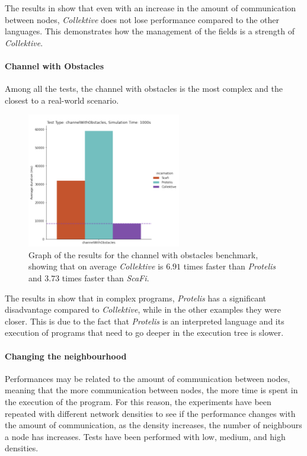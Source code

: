 The results in  show that even with an increase in the amount of communication between nodes,
\emph{Collektive} does not lose performance compared to the other languages.
This demonstrates how the management of the fields is a strength of \emph{Collektive}.

\paragraph{Channel with Obstacles}
Among all the tests, the channel with obstacles is the most complex and the closest to a real-world scenario.

\begin{figure}[ht!]
    \centering
    \includegraphics[width=0.6\textwidth]{figures/channel-results}
    \caption{Graph of the results for the channel with obstacles benchmark, showing that on average \emph{Collektive} is $6.91$ times faster
    than \emph{Protelis} and $3.73$ times faster than \emph{ScaFi}.}
    \label{fig:channel-with-obstacles}
\end{figure}

The results in  show that in complex programs, \emph{Protelis} has a significant
disadvantage compared to \emph{Collektive}, while in the other examples they were closer.
This is due to the fact that \emph{Protelis} is an interpreted language and its execution of programs that need to go
deeper in the execution tree is slower.

\paragraph{Changing the neighbourhood}
Performances may be related to the amount of communication between nodes, meaning that the more communication
between nodes, the more time is spent in the execution of the program.
For this reason, the experiments have been repeated with different network densities to see if the performance changes with
the amount of communication, as the density increases, the number of neighbours a node has increases.
Tests have been performed with low, medium, and high densities.

